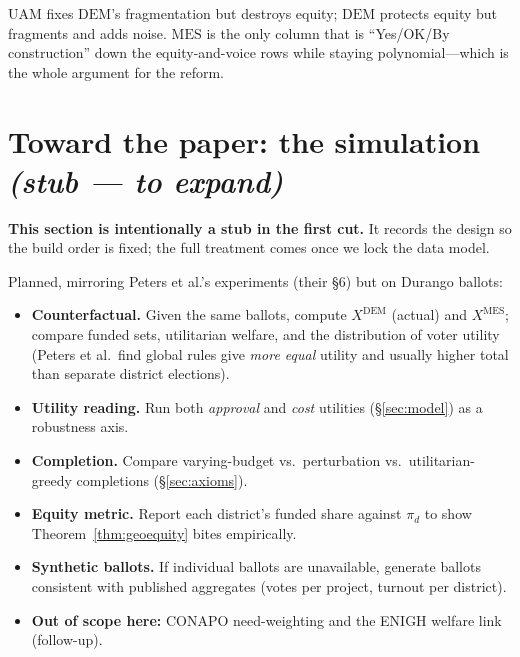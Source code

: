 \documentclass[11pt,letterpaper]{article}
\theoremstyle{definition}
\theoremstyle{plain}
\theoremstyle{remark}
\newcommand{\popshare}{\pi}        %
\newcommand{\DEM}{\mathrm{DEM}}
\newcommand{\UAM}{\mathrm{UAM}}
\newcommand{\MES}{\mathrm{MES}}
\begin{document}
\begin{keyidea}
$\UAM$ fixes $\DEM$'s fragmentation but destroys equity; $\DEM$ protects equity but fragments and
adds noise. $\MES$ is the only column that is ``Yes/OK/By construction'' down the equity-and-voice
rows while staying polynomial---which is the whole argument for the reform.
\end{keyidea}

\section{Toward the paper: the simulation \emph{(stub --- to expand)}}
\label{sec:simulation}

\begin{aside}\small
\textbf{This section is intentionally a stub in the first cut.} It records the design so the build
order is fixed; the full treatment comes once we lock the data model.
\end{aside}

Planned, mirroring Peters et al.'s experiments (their \S6) but on Durango ballots:
\begin{itemize}[leftmargin=1.4em,itemsep=2pt,topsep=2pt]
  \item \textbf{Counterfactual.} Given the same ballots, compute $X^{\DEM}$ (actual) and
  $X^{\MES}$; compare funded sets, utilitarian welfare, and the distribution of voter utility
  (Peters et al.\ find global rules give \emph{more equal} utility and usually higher total than
  separate district elections).
  \item \textbf{Utility reading.} Run both \emph{approval} and \emph{cost} utilities (\S\ref{sec:model})
  as a robustness axis.
  \item \textbf{Completion.} Compare varying-budget vs.\ perturbation vs.\ utilitarian-greedy
  completions (\S\ref{sec:axioms}).
  \item \textbf{Equity metric.} Report each district's funded share against $\popshare_d$ to show
  Theorem~\ref{thm:geoequity} bites empirically.
  \item \textbf{Synthetic ballots.} If individual ballots are unavailable, generate ballots
  consistent with published aggregates (votes per project, turnout per district).
  \item \textbf{Out of scope here:} CONAPO need-weighting and the ENIGH welfare link (follow-up).
\end{itemize}
\end{document}

